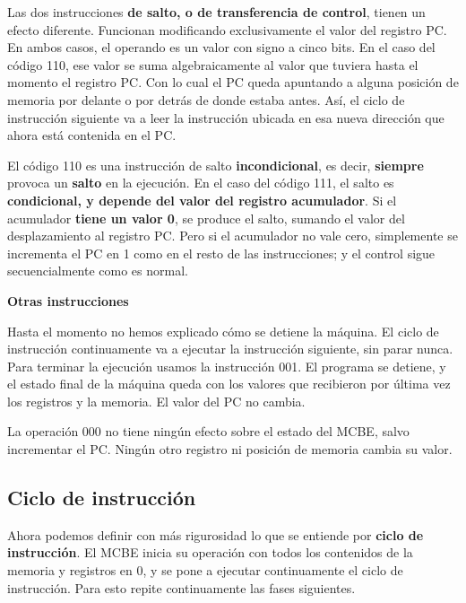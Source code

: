 \documentclass[spanish,A4,]{article}
\begin{document}
Las dos instrucciones \textbf{de salto, o de transferencia de control},
tienen un efecto diferente. Funcionan modificando exclusivamente el
valor del registro PC. En ambos casos, el operando es un valor con signo
a cinco bits. En el caso del código 110, ese valor se suma
algebraicamente al valor que tuviera hasta el momento el registro PC.
Con lo cual el PC queda apuntando a alguna posición de memoria por
delante o por detrás de donde estaba antes. Así, el ciclo de instrucción
siguiente va a leer la instrucción ubicada en esa nueva dirección que
ahora está contenida en el PC.

El código 110 es una instrucción de salto \textbf{incondicional}, es
decir, \textbf{siempre} provoca un \textbf{salto} en la ejecución. En el
caso del código 111, el salto es \textbf{condicional, y depende del
valor del registro acumulador}. Si el acumulador \textbf{tiene un valor
0}, se produce el salto, sumando el valor del desplazamiento al registro
PC. Pero si el acumulador no vale cero, simplemente se incrementa el PC
en 1 como en el resto de las instrucciones; y el control sigue
secuencialmente como es normal.

\textbf{Otras instrucciones}

Hasta el momento no hemos explicado cómo se detiene la máquina. El ciclo
de instrucción continuamente va a ejecutar la instrucción siguiente, sin
parar nunca. Para terminar la ejecución usamos la instrucción 001. El
programa se detiene, y el estado final de la máquina queda con los
valores que recibieron por última vez los registros y la memoria. El
valor del PC no cambia.

La operación 000 no tiene ningún efecto sobre el estado del MCBE, salvo
incrementar el PC. Ningún otro registro ni posición de memoria cambia su
valor.

\subsection{Ciclo de instrucción}\label{ciclo-de-instrucciuxf3n}

Ahora podemos definir con más rigurosidad lo que se entiende por
\textbf{ciclo de instrucción}. El MCBE inicia su operación con todos los
contenidos de la memoria y registros en 0, y se pone a ejecutar
continuamente el ciclo de instrucción. Para esto repite continuamente
las fases siguientes.
\end{document}
